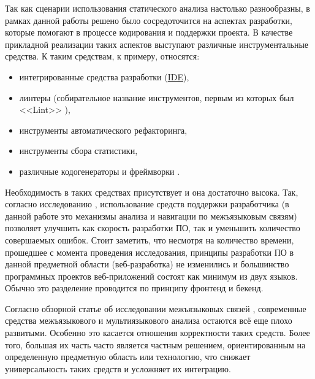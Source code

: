 Так как сценарии использования статического анализа настолько разнообразны, в рамках данной работы
решено было сосредоточится на аспектах разработки, которые помогают в процессе кодирования и поддержки проекта.
В качестве прикладной реализации таких аспектов выступают различные инструментальные средства.
К таким средствам, к примеру, относятся:
\begin{itemize}
    \item интегрированные средства разработки (\hyperlink{IDE}{IDE}),
    \item линтеры (собирательное название инструментов, первым из которых был <<Lint>> \cite{linter}),
    \item инструменты автоматического рефакторинга,
    \item инструменты сбора статистики,
    \item различные кодогенераторы и фреймворки \cite{qt-moc}\cite{react}.
\end{itemize}

Необходимость в таких средствах присутствует и она достаточно высока. Так, согласно
исследованию \cite{aid-developers}, использование средств поддержки разработчика
(в данной работе это механизмы анализа и навигации по межъязыковым связям) позволяет
улучшить как скорость разработки ПО, так и уменьшить количество совершаемых ошибок. Стоит заметить,
что несмотря на количество времени, прошедшее с момента проведения исследования, 
принципы разработки ПО в данной предметной области (веб-разработка) не изменились и большинство
программных проектов веб-приложений состоят как минимум из двух языков. 
Обычно это разделение проводится по принципу фронтенд и бекенд.

Согласно обзорной статье об исследовании межъязыковых связей \cite{pragmatic-evidence}, современные средства межъязыкового
и мультиязыкового анализа остаются всё еще плохо развитыми. Особенно это касается отношения корректности
таких средств. Более того, большая их часть часто является частным решением, ориентированным на определенную
предметную область или технологию, что снижает универсальность таких средств и усложняет их интеграцию.

